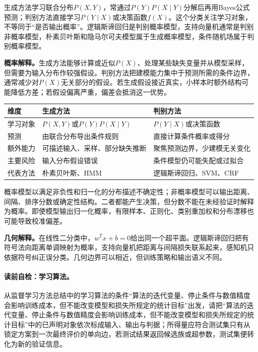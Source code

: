 生成方法学习联合分布$P(X,Y)$，常通过$P(Y)P(X\mid Y)$分解后再用Bayes公式预测；判别方法直接学习$P(Y\mid X)$或决策函数$f(X)$。这个分类关注学习对象，不等同于“是否输出概率”。逻辑斯谛回归是判别概率模型，支持向量机通常是判别非概率模型，朴素贝叶斯和隐马尔可夫模型属于生成概率模型，条件随机场属于判别概率模型。

\label{struct:V3-C07-CH15}
\textbf{概率解释。}生成方法能够计算或近似$P(X)$、处理某些缺失变量并从模型采样，但需要为输入分布作较强假设。判别方法把建模能力集中于预测所需的条件边界，通常减少对$P(X)$无关部分的假设。若生成假设接近真实，小样本时额外结构可能降低方差；若假设偏离严重，偏差会抵消这一优势。

\begin{comparisonbox}
\begin{tabularx}{\linewidth}{@{}l X X@{}}
\toprule 维度 & 生成方法 & 判别方法\\ \midrule
学习对象 & $P(X,Y)$或$P(Y)P(X\mid Y)$ & $P(Y\mid X)$或决策函数\\
预测 & 由联合分布导出条件规则 & 直接计算条件概率或得分\\
额外能力 & 可描述输入、采样、部分缺失推断 & 聚焦预测边界，少建模无关变化\\
主要风险 & 输入分布假设错误 & 条件模型仍可能失配或过拟合\\
代表方法 & 朴素贝叶斯、HMM & 逻辑斯谛回归、SVM、CRF\\
\bottomrule
\end{tabularx}
\end{comparisonbox}


概率模型以满足非负性和归一化的分布描述不确定性；非概率模型可以输出距离、间隔、排序分数或确定性结构。二者都能产生决策，但分数不能在未经验证时解释为概率。即使模型输出归一化概率，有限样本、正则化、类别重加权和分布漂移也可能导致校准偏差。

\label{struct:V3-C07-CH14}
\textbf{几何解释。}在线性二分类中，$w^Tx+b=0$给出同一个超平面。逻辑斯谛回归把有符号法向距离单调映射为概率，支持向量机把距离与间隔损失联系起来，感知机只依据符号纠正误分类。几何边界可以相近，但训练策略和输出语义不同。


\paragraph{读前自检：学习算法。}从监督学习方法总结中的学习算法的条件“算法的迭代变量、停止条件与数值精度会影响训练成本，但不能改变模型和损失所规定的统计目标”出发，请把“算法的迭代变量、停止条件与数值精度会影响训练成本，但不能改变模型和损失所规定的统计目标”中的已声明对象依次标成输入、输出与判据；所得量应符合测试集只有从锁定方案到一次最终评价的单向边，若测试结果返回候选族或超参数，测试集便转化为新的验证信息。\par

